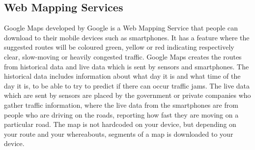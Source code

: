 \subsection{Web Mapping Services}
%
Google Maps developed by Google is a Web Mapping Service that people can download to their mobile devices such as smartphones. It has a feature where the suggested routes will be coloured green, yellow or red indicating respectively clear, slow-moving or heavily congested traffic. 
Google Maps creates the routes from historical data and live data which is sent by sensors and smartphones. The historical data includes information about what day it is and what time of the day it is, to be able to try to predict if there can occur traffic jams. The live data which are sent by sensors are placed by the government or private companies who gather traffic information, where the live data from the smartphones are from people who are driving on the roads, reporting how fast they are moving on a particular road. The map is not hardcoded on your device, but depending on your route and your whereabouts, segments of a map is downloaded to your device.
